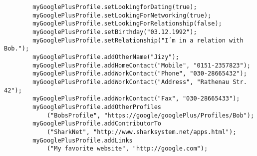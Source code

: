 \documentclass[12pt]{article}
\begin{document}
\begin{verbatim}
        myGooglePlusProfile.setLookingforDating(true);
        myGooglePlusProfile.setLookingForNetworking(true);
        myGooglePlusProfile.setLookingForRelationship(false);
        myGooglePlusProfile.setBirthday("03.12.1992");
        myGooglePlusProfile.setRelationship("I´m in a relation with Bob.");
        myGooglePlusProfile.addOtherName("Jizy");
        myGooglePlusProfile.addHomeContact("Mobile", "0151-2357823");
        myGooglePlusProfile.addWorkContact("Phone", "030-28665432");
        myGooglePlusProfile.addWorkContact("Address", "Rathenau Str. 42");
        myGooglePlusProfile.addWorkContact("Fax", "030-28665433");
        myGooglePlusProfile.addOtherProfiles
            ("BobsProfile", "https://google/googlePlus/Profiles/Bob");
        myGooglePlusProfile.addContributorTo
            ("SharkNet", "http://www.sharksystem.net/apps.html");
        myGooglePlusProfile.addLinks
            ("My favorite website", "http://google.com");
       

\end{verbatim}
\end{document}
